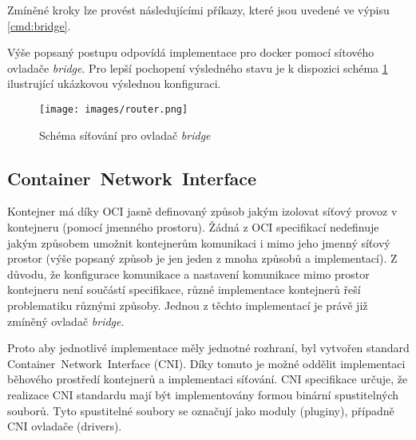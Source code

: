\cite{velichko_2020_container}

Zmíněné kroky lze provést následujícími příkazy, které jsou uvedené ve výpisu \ref{cmd:bridge}.



Výše popsaný postupu odpovídá implementace pro docker pomocí sítového ovladače \textit{bridge}. Pro lepší pochopení výsledného stavu je k dispozici schéma \ref{img:ContainerNetworking} ilustrující ukázkovou výslednou konfiguraci.

\begin{figure}[ht]
\centering
\texttt{[image: images/router.png]}
\caption[Schéma síťování pro ovladač bridge]{Schéma síťování pro ovladač \textit{bridge} \cite{velichko_2020_connecting}}\label{img:ContainerNetworking}
\end{figure}

\subsection{Container~Network~Interface}\label{cni}
Kontejner má díky OCI jasně definovaný způsob jakým izolovat síťový provoz v kontejneru (pomocí jmenného prostoru). Žádná z OCI specifikací nedefinuje jakým způsobem umožnit kontejnerům komunikaci i mimo jeho jmenný síťový prostor (výše popsaný způsob je jen jeden z mnoha způsobů a implementací). Z důvodu, že konfigurace komunikace a nastavení komunikace mimo prostor kontejneru není součástí specifikace, různé implementace kontejnerů řeší problematiku různými způsoby. Jednou z těchto implementací je právě již zmíněný ovladač \textit{bridge}.

Proto aby jednotlivé implementace měly jednotné rozhraní, byl vytvořen standard Container~Network~Interface (CNI). Díky tomuto je možné oddělit implementaci běhového prostředí kontejnerů a implementaci síťování. CNI specifikace určuje, že realizace CNI standardu mají být implementovány formou binární spustitelných souborů. Tyto spustitelné soubory se označují jako moduly (pluginy), případně CNI ovladače (drivers).

